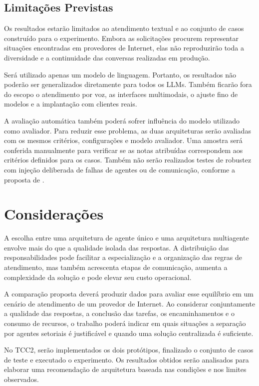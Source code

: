 \documentclass[11pt]{ifscarticle}
\begin{document}
\subsection{Limitações Previstas}

Os resultados estarão limitados ao atendimento textual e ao conjunto de casos construído para o experimento. Embora as solicitações procurem representar situações encontradas em provedores de Internet, elas não reproduzirão toda a diversidade e a continuidade das conversas realizadas em produção.

Será utilizado apenas um modelo de linguagem. Portanto, os resultados não poderão ser generalizados diretamente para todos os LLMs. Também ficarão fora do escopo o atendimento por voz, as interfaces multimodais, o ajuste fino de modelos e a implantação com clientes reais.

A avaliação automática também poderá sofrer influência do modelo utilizado como avaliador. Para reduzir esse problema, as duas arquiteturas serão avaliadas com os mesmos critérios, configurações e modelo avaliador. Uma amostra será conferida manualmente para verificar se as notas atribuídas correspondem aos critérios definidos para os casos. Também não serão realizados testes de robustez com injeção deliberada de falhas de agentes ou de comunicação, conforme a proposta de \textcite{j.owotogbeAssessingEnhancingRobustness2025a}.

\section{Considerações}

A escolha entre uma arquitetura de agente único e uma arquitetura multiagente envolve mais do que a qualidade isolada das respostas. A distribuição das responsabilidades pode facilitar a especialização e a organização das regras de atendimento, mas também acrescenta etapas de comunicação, aumenta a complexidade da solução e pode elevar seu custo operacional.

A comparação proposta deverá produzir dados para avaliar esse equilíbrio em um cenário de atendimento de um provedor de Internet. Ao considerar conjuntamente a qualidade das respostas, a conclusão das tarefas, os encaminhamentos e o consumo de recursos, o trabalho poderá indicar em quais situações a separação por agentes setoriais é justificável e quando uma solução centralizada é suficiente.

No TCC2, serão implementados os dois protótipos, finalizado o conjunto de casos de teste e executado o experimento. Os resultados obtidos serão analisados para elaborar uma recomendação de arquitetura baseada nas condições e nos limites observados.

\printbibliography[heading=bibintoc,title={Referências}]
\end{document}
